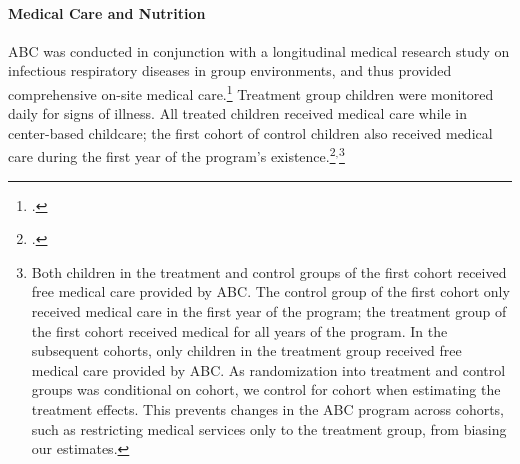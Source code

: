\paragraph{Medical Care and Nutrition}
ABC was conducted in conjunction with a longitudinal medical research study on infectious respiratory diseases in group environments, and thus provided comprehensive on-site medical care.\footnote{\citet{Henderson-et-al_1982_NEJoM}.} Treatment group children were monitored daily for signs of illness. All treated children received medical care while in center-based childcare; the first cohort of control children also received medical care during the first year of the program's existence.\footnote{\citet{Ramey_Collier_etal_1976_CarolinaAbecedarianProject,Ramey_Campbell_1991_childreninpoverty,Campbell_Ramey_1994_CD}.}$^{,}$\footnote{Both children in the treatment and control groups of the first cohort received free medical care provided by ABC. The control group of the first cohort only received medical care in the first year of the program; the treatment group of the first cohort received medical for all years of the program. In the subsequent cohorts, only children in the treatment group received free medical care provided by ABC. As randomization into treatment and control groups was conditional on cohort, we control for cohort when estimating the treatment effects. This prevents changes in the ABC program across cohorts, such as restricting medical services only to the treatment group, from biasing our estimates.}\\

